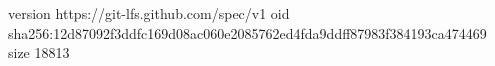 version https://git-lfs.github.com/spec/v1
oid sha256:12d87092f3ddfc169d08ac060e2085762ed4fda9ddff87983f384193ca474469
size 18813
